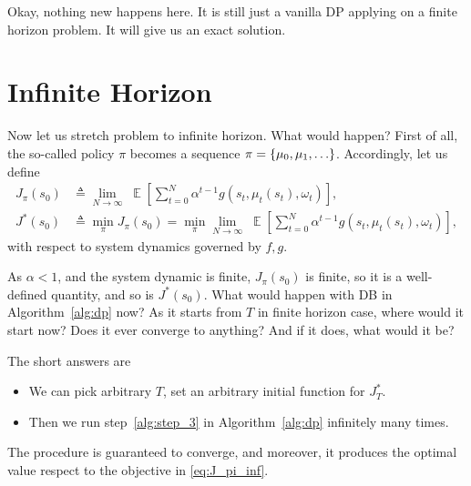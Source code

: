 \documentclass[11pt,a4paper]{article}
\begin{document}
{\blue Okay, nothing new happens here. It is still just a vanilla DP applying on a finite horizon problem. It will give us an exact solution.}

\section{Infinite Horizon}%
\label{sec:infinite_horizon}

Now let us stretch problem to infinite horizon. What would happen? 
First of all, the so-called policy $\pi$ becomes a sequence $\pi = \left\{\mu_0, \mu_1, \ldots \right\}$. 
Accordingly, let us define
\begin{align}
    J_{\pi}(s_0) &\triangleq \lim_{N \to \infty} \; \mathop{\mathbb{E}} \left[  \sum^{N}_{t=0} \alpha ^{t-1} g(s_t, \mu_t(s_t), \omega_t)\right], \label{eq:J_pi_inf} \\
    J^{*}(s_0) &\triangleq \min_{\pi} J_\pi(s_0) = \min_{\pi} \lim_{N \to \infty} \; \mathop{\mathbb{E}} \left[  \sum^{N}_{t=0} \alpha ^{t-1} g(s_t, \mu_t(s_t), \omega_t)\right], \label{eq:J_opt_inf}
\end{align} 
with respect to system dynamics governed by $f, g$.


As $\alpha<1$, and the system dynamic is finite, $J_\pi(s_0)$ is finite, so it is a well-defined quantity, and so is $J^{*}(s_0)$.
What would happen with DB in Algorithm~\ref{alg:dp} now? As it starts from $T$ in finite horizon case, where would it start now? Does it ever converge to anything? And if it does, what would it be?

The short answers are
\begin{itemize}
    \item We can pick arbitrary $T$, set an arbitrary initial function for $J^{*}_T$.
    \item Then we run step~\ref{alg:step_3} in Algorithm~\ref{alg:dp} infinitely many times.
\end{itemize}
The procedure is guaranteed to converge, and moreover, it produces the optimal value respect to the objective in \eqref{eq:J_pi_inf}.
\end{document}
